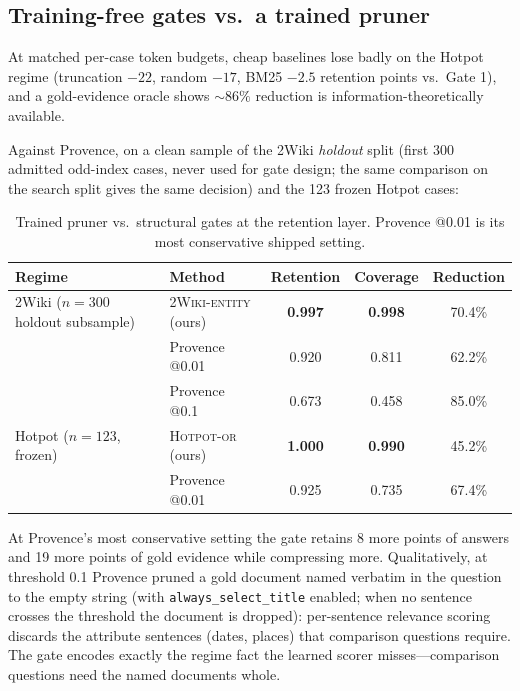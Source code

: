 \documentclass[11pt]{article}
\newcommand{\gateone}{\textsc{Hotpot-or}}
\newcommand{\gatetwo}{\textsc{2Wiki-entity}}
\begin{document}
\subsection{Training-free gates vs.\ a trained pruner}
\label{sec:provence}

At matched per-case token budgets, cheap baselines lose badly on the
Hotpot regime (truncation $-22$, random $-17$, BM25 $-2.5$ retention
points vs.\ Gate 1), and a gold-evidence oracle shows ${\sim}86\%$
reduction is information-theoretically available.

Against Provence, on a clean sample of the 2Wiki \emph{holdout} split
(first 300 admitted odd-index cases, never used for gate design; the same
comparison on the search split gives the same decision) and the 123
frozen Hotpot cases:

\begin{table}[h]
\centering\small
\begin{tabular}{llccc}
\toprule
Regime & Method & Retention & Coverage & Reduction \\
\midrule
2Wiki ($n{=}300$ holdout subsample) & \gatetwo{} (ours) & \textbf{0.997} & \textbf{0.998} & 70.4\% \\
       & Provence @0.01         & 0.920 & 0.811 & 62.2\% \\
       & Provence @0.1          & 0.673 & 0.458 & 85.0\% \\
\midrule
Hotpot ($n{=}123$, frozen) & \gateone{} (ours) & \textbf{1.000} & \textbf{0.990} & 45.2\% \\
       & Provence @0.01         & 0.925 & 0.735 & 67.4\% \\
\bottomrule
\end{tabular}
\caption{Trained pruner vs.\ structural gates at the retention layer.
Provence @0.01 is its most conservative shipped setting.}
\end{table}

At Provence's most conservative setting the gate retains 8 more points of
answers and 19 more points of gold evidence while compressing more.
Qualitatively, at threshold 0.1 Provence pruned a gold document named
verbatim in the question to the empty string (with
\texttt{always\_select\_title} enabled; when no sentence crosses the
threshold the document is dropped): per-sentence relevance scoring
discards the attribute sentences (dates, places) that comparison questions
require. The gate encodes exactly the regime fact the learned scorer
misses---comparison questions need the named documents whole.
\end{document}
